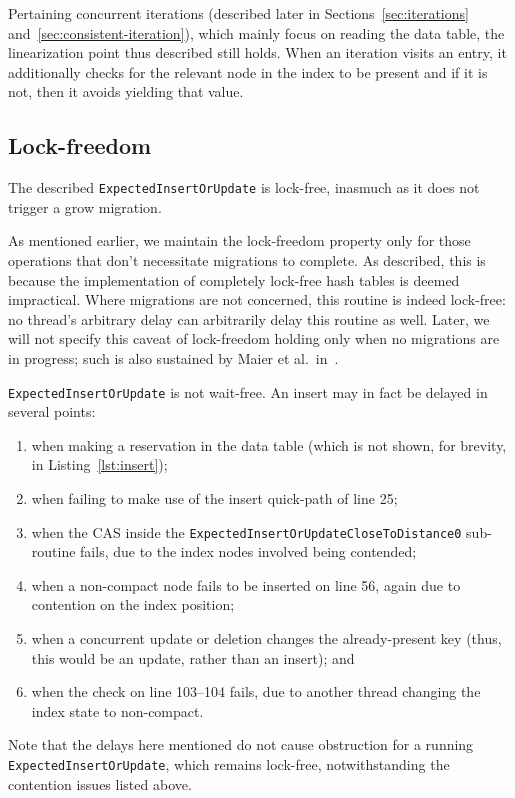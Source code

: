 Pertaining concurrent iterations (described later in Sections~\ref{sec:iterations} and~\ref{sec:consistent-iteration}), which mainly focus on reading the data table, the linearization point thus described still holds.
When an iteration visits an entry, it additionally checks for the relevant node in the index to be present and if it is not, then it avoids yielding that value.

\subsection{Lock-freedom}\label{subsec:insert-lock-freedom}

The described \texttt{ExpectedInsertOrUpdate} is lock-free, inasmuch as it does not trigger a grow migration.

As mentioned earlier, we maintain the lock-freedom property only for those operations that don't necessitate migrations to complete.
As described, this is because the implementation of completely lock-free hash tables is deemed impractical.
Where migrations are not concerned, this routine is indeed lock-free: no thread's arbitrary delay can arbitrarily delay this routine as well.
Later, we will not specify this caveat of lock-freedom holding only when no migrations are in progress; such is also sustained by Maier et al.\ in~\cite{maier}.

\texttt{ExpectedInsertOrUpdate} is not wait-free.
An insert may in fact be delayed in several points:
\begin{enumerate}
    \item when making a reservation in the data table (which is not shown, for brevity, in Listing~\ref{lst:insert});
    \item when failing to make use of the insert quick-path of line 25;
    \item when the CAS inside the \texttt{ExpectedInsertOrUpdateCloseToDistance0} sub-routine fails, due to the index nodes involved being contended;
    \item when a non-compact node fails to be inserted on line 56, again due to contention on the index position;
    \item when a concurrent update or deletion changes the already-present key (thus, this would be an update, rather than an insert); and
    \item when the check on line 103--104 fails, due to another thread changing the index state to non-compact.
\end{enumerate}
Note that the delays here mentioned do not cause obstruction for a running \texttt{ExpectedInsertOrUpdate}, which remains lock-free, notwithstanding the contention issues listed above.


